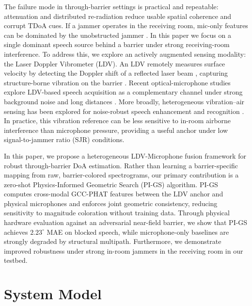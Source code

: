 \documentclass{Interspeech}
\begin{document}
The failure mode in through-barrier settings is practical and repeatable: attenuation and distributed re-radiation reduce usable spatial coherence and corrupt TDoA cues. If a jammer operates in the receiving room, mic-only features can be dominated by the unobstructed jammer \cite{adavanne2019seld, kulkarni2024doa}. In this paper we focus on a single dominant speech source behind a barrier under strong receiving-room interference. To address this, we explore an actively augmented sensing modality: the Laser Doppler Vibrometer (LDV). An LDV remotely measures surface velocity by detecting the Doppler shift of a reflected laser beam \cite{rothberg2017ldv}, capturing structure-borne vibration on the barrier \cite{reed2006ldvspeech, bocko2023estimating}. Recent optical-microphone studies explore LDV-based speech acquisition as a complementary channel under strong background noise and long distances \cite{lin2022mask_ldv, lin2023tbme_optical}. More broadly, heterogeneous vibration--air sensing has been explored for noise-robust speech enhancement and recognition \cite{wang2022icassp_bcac, wang2022taslp_bcac, miyagi2025ldv_asr, chen2025embc_ldv_ssl}. In practice, this vibration reference can be less sensitive to in-room airborne interference than microphone pressure, providing a useful anchor under low signal-to-jammer ratio (SJR) conditions.

In this paper, we propose a heterogeneous LDV-Microphone fusion framework for robust through-barrier DoA estimation. Rather than learning a barrier-specific mapping from raw, barrier-colored spectrograms, our primary contribution is a zero-shot Physics-Informed Geometric Search (PI-GS) algorithm. PI-GS computes cross-modal GCC-PHAT features between the LDV anchor and physical microphones and enforces joint geometric consistency, reducing sensitivity to magnitude coloration without training data. Through physical hardware evaluation against an adversarial near-field barrier, we show that PI-GS achieves $2.23^\circ$ MAE on blocked speech, while microphone-only baselines are strongly degraded by structural multipath. Furthermore, we demonstrate improved robustness under strong in-room jammers in the receiving room in our testbed.

\section{System Model}
\label{sec:system}
\end{document}

